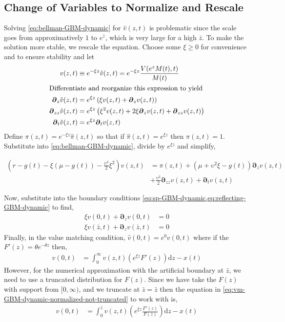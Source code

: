 \documentclass[11pt]{article}
\newcommand{\D}[1][]{\ensuremath{\boldsymbol{\partial}_{#1}}}
\newcommand{\diff}{\ensuremath{\mathrm{d}}}
\begin{document}
\subsection{Change of Variables to Normalize and Rescale}\label{eq:simple-rescale}
Solving \cref{eq:bellman-GBM-dynamic} for $\hat{v}(z,t)$ is problematic since the scale goes from approximatively $1$ to $e^{\bar{z}}$, which is very large for a high $\bar{z}$.  To make the solution more stable, we rescale the equation.  Choose some $\xi \geq 0$ for convenience and to ensure stability and let
\begin{align}
	v(z,t) &\equiv e^{-\xi z}\hat{v}(z,t) = e^{-\xi z}\frac{V(e^z M(t),t)}{M(t)}\\
	\intertext{Differentiate and reorganize this expression to yield}
	\D[z]\hat{v}(z,t) &= e^{\xi z}\left(\xi v(z,t) + \D[z]v(z,t) \right)\\
	\D[zz]\hat{v}(z,t) &= e^{\xi z}\left(\xi^{2} v(z,t) + 2 \xi\D[z]v(z,t) + \D[zz]v(z,t)  \right)\\
	\D[t]\hat{v}(z,t) &= e^{\xi z} \D[t]v(z,t)
\end{align}
Define $\pi(z,t) = e^{-\xi z}\hat{\pi}(z,t)$ so that if $\hat{\pi}(z,t) = e^{\xi z}$ then $\pi(z,t) = 1$.  Substitute into \cref{eq:bellman-GBM-dynamic}, divide by $e^{\xi z}$ and simplify,

\begin{align}
	\left(r - g(t)- \xi(\mu-g(t)) - \frac{\upsilon^2}{2}\xi^2\right)  v(z,t) &= \pi(z,t) + (\mu+ \upsilon^2\xi - g(t)) \D[z]v(z,t) \nonumber \\ &+ \frac{\upsilon^2}{2} \D[zz]v(z,t) + \D[t]v(z,t)  \label{eq:bellman-GBM-dynamic-normalized}
\end{align}

Now, substitute into the boundary conditions \cref{eq:sp-GBM-dynamic,eq:reflecting-GBM-dynamic} to find,
\begin{align}
	\xi v(0,t) + \D[z]v(0,t ) &= 0\label{eq:new-BC1}\\
	\xi v(\bar{z},t) + \D[z]v(\bar{z},t) &= 0\label{eq:new-BC2}
\end{align}
Finally, in the value matching condition, $\hat{v}(0,t) = e^{0} v(0,t)$ where if the $F'(z) = \theta e^{-\theta z}$ then,
\begin{align}
	 v(0,t) &= \int_{0}^{\infty}  v(z,t) \left(e^{\xi z} F'(z)\right) \diff z - x(t)\label{eq:vm-GBM-dynamic-normalized-not-truncated}
\end{align}
However, for the numerical approximation with the artificial boundary at $\bar{z}$, we need to use a truncated distribution for $F(z)$.  Since we have take the $F(z)$ with support from $[0,\infty)$, and we truncate at $\bar{z} = \bar{z}$ then the equation in \cref{eq:vm-GBM-dynamic-normalized-not-truncated} to work with is,
\begin{align}
	 v(0,t) &= \int_{0}^{\bar{z}}  v(z,t) \left(e^{\xi z} \frac{F'(z)}{F(\bar{z})}\right) \diff z - x(t)\label{eq:vm-GBM-dynamic-normalized}
\end{align}
\end{document}
